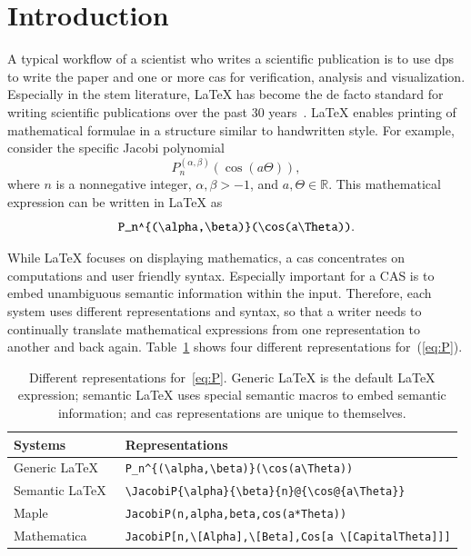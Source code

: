 \documentclass[a4paper,11pt]{article}
\newcommand{\Maple}{Maple}
\newcommand{\Mathematica}{Mathematica}
\theoremstyle{defTheoStyle}
\theoremstyle{defExampStyle}
\DeclareRobustCommand{\Real}{\mathbb{R}}
\begin{document}
	\section{Introduction}
	A typical workflow of a scientist who writes a scientific publication is to use \gls*{dps} to write the paper and one or more \gls*{cas} for verification, analysis and visualization. Especially in the \gls*{stem} literature, \LaTeX{}
	has become the de facto standard for writing scientific publications over the past 30 years~\parencites{Knuth}[559]{DigitalTypo}{LATEX:Standard}. \LaTeX{} enables printing of mathematical formulae in a structure similar to handwritten style. For example, consider the specific Jacobi polynomial~\parencite[Table 18.3.1]{NIST:DLMF}
	\begin{equation}\label{eq:P}
	P_n^{(\alpha , \beta)}(\cos(a\Theta)),
	\end{equation}
	where $n$ is a nonnegative integer, $\alpha, \beta > -1$, and $a,\Theta\in \Real$.
	This mathematical expression can be written in \LaTeX{} as
	\begin{equation*}
		\verb|P_n^{(\alpha,\beta)}(\cos(a\Theta))|.
	\end{equation*}
	
	While \LaTeX{} focuses on displaying mathematics, a \gls*{cas} concentrates on computations and user friendly syntax. Especially important for a CAS is to embed unambiguous semantic information within the input. Therefore, each system uses different representations and syntax, so that a writer needs to continually translate mathematical expressions from one representation to another and back again. Table~\ref{tab:JacobiP-usecase} shows four different representations for~(\ref{eq:P}).
	
	\begin{table}[ht]
		\centering
		\begin{tabular}{ll}
			\hline
			Systems & Representations \\
			\hline
			\hline
			Generic \LaTeX\ & \verb|P_n^{(\alpha,\beta)}(\cos(a\Theta))| \\ 
			Semantic \LaTeX\ & \verb|\JacobiP{\alpha}{\beta}{n}@{\cos@{a\Theta}}| \\
			\Maple & \verb|JacobiP(n,alpha,beta,cos(a*Theta))| \\ 
			\Mathematica & \verb|JacobiP[n,\[Alpha],\[Beta],Cos[a \[CapitalTheta]]]|\\
			\hline
		\end{tabular}
		\caption{Different representations for~\eqref{eq:P}. Generic \LaTeX{} is the default \LaTeX{} expression; semantic \LaTeX{} uses special semantic macros to embed semantic information; and \gls*{cas} representations are unique to themselves.}
		\label{tab:JacobiP-usecase}
	\end{table}
	
\end{document}
